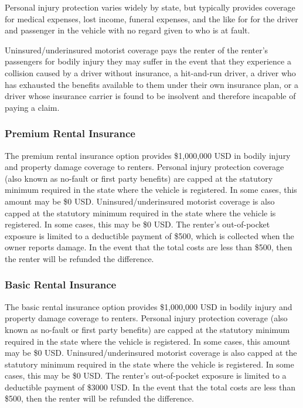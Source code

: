 \documentclass[review,12pt]{elsarticle}
\begin{document}
Personal injury protection varies widely by state, but typically provides coverage for medical expenses, lost income, funeral expenses, and the like for for the driver and passenger in the vehicle with no regard given to who is at fault.

Uninsured/underinsured motorist coverage pays the renter of the renter's passengers for bodily injury they may suffer in the event that they experience a collision caused by a driver without insurance, a hit-and-run driver, a driver who has exhausted the benefits available to them under their own insurance plan, or a driver whose insurance carrier is found to be insolvent and therefore incapable of paying a claim.

\subsubsection{Premium Rental Insurance}\label{premium-rental-insurance}
The premium rental insurance option provides \$1,000,000 USD in bodily injury and property damage coverage to renters. Personal injury protection coverage (also known as no-fault or first party benefits) are capped at the statutory minimum required in the state where the vehicle is registered. In some cases, this amount may be \$0 USD. Uninsured/underinsured motorist coverage is also capped at the statutory minimum required in the state where the vehicle is registered. In some cases, this may be \$0 USD. The renter's out-of-pocket exposure is limited to a deductible payment of \$500, which is collected when the owner reports damage. In the event that the total costs are less than \$500, then the renter will be refunded the difference.

\subsubsection{Basic Rental Insurance}\label{basic-rental-insurance}
The basic rental insurance option provides \$1,000,000 USD in bodily injury and property damage coverage to renters. Personal injury protection coverage (also known as no-fault or first party benefits) are capped at the statutory minimum required in the state where the vehicle is registered. In some cases, this amount may be \$0 USD. Uninsured/underinsured motorist coverage is also capped at the statutory minimum required in the state where the vehicle is registered. In some cases, this may be \$0 USD. The renter's out-of-pocket exposure is limited to a deductible payment of \$3000 USD. In the event that the total costs are less than \$500, then the renter will be refunded the difference.
\end{document}
